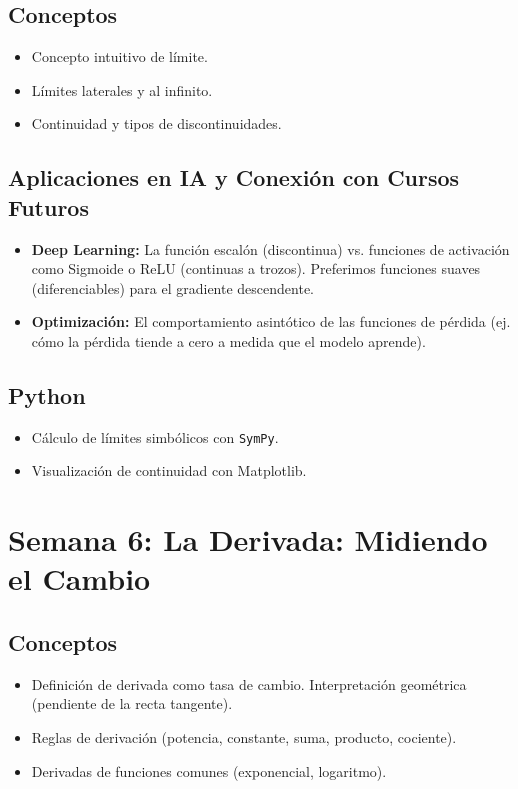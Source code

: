\documentclass[12pt,a4paper,openany,oneside]{book}
\begin{document}
\subsection{Conceptos}
\begin{itemize}
    \item Concepto intuitivo de límite.
    \item Límites laterales y al infinito.
    \item Continuidad y tipos de discontinuidades.
\end{itemize}

\subsection{Aplicaciones en IA y Conexión con Cursos Futuros}
\begin{itemize}
    \item \textbf{Deep Learning:} La función escalón (discontinua) vs. funciones de activación como Sigmoide o ReLU (continuas a trozos). Preferimos funciones suaves (diferenciables) para el gradiente descendente.
    \item \textbf{Optimización:} El comportamiento asintótico de las funciones de pérdida (ej. cómo la pérdida tiende a cero a medida que el modelo aprende).
\end{itemize}

\subsection{Python}
\begin{itemize}
    \item Cálculo de límites simbólicos con \texttt{SymPy}.
    \item Visualización de continuidad con Matplotlib.
\end{itemize}

\section{Semana 6: La Derivada: Midiendo el Cambio}

\subsection{Conceptos}
\begin{itemize}
    \item Definición de derivada como tasa de cambio. Interpretación geométrica (pendiente de la recta tangente).
    \item Reglas de derivación (potencia, constante, suma, producto, cociente).
    \item Derivadas de funciones comunes (exponencial, logaritmo).
\end{itemize}
\end{document}
